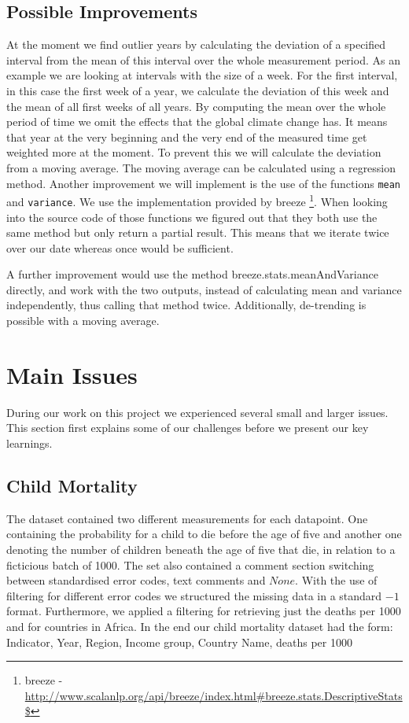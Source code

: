 \documentclass[
10pt, %
a4paper, %
oneside, %
headinclude,footinclude, %
useAMS,
usenatbib
]{template/mn2e}  %
\begin{document}
\subsection{Possible Improvements}
At the moment we find outlier years by calculating the deviation of a specified interval from the mean of this interval over the whole measurement period. As an example we are looking at intervals with the size of a week. For the first interval, in this case the first week of a year, we calculate the deviation of this week and the mean of all first weeks of all years. By computing the mean over the whole period of time we omit the effects that the global climate change has. It means that year at the very beginning and the very end of the measured time get weighted more at the moment. To prevent this we will calculate the deviation from a moving average. The moving average can be calculated using a regression method.  Another improvement we will implement is the use of the functions \texttt{mean} and \texttt{variance}. We use the implementation provided by breeze \footnote{breeze -  \url{http://www.scalanlp.org/api/breeze/index.html\#breeze.stats.DescriptiveStats\$}}. When looking into the source code of those functions we figured out that they both use the same method but only return a partial result. This means that we iterate twice over our date whereas once would be sufficient.

A further improvement would use the method breeze.stats.meanAndVariance directly, and work with the two outputs, instead of calculating mean and variance independently, thus calling that method twice.
Additionally, de-trending is possible with a moving average.


\section{Main Issues}
\label{sec:issues}
During our work on this project we experienced several small and larger issues. This section first explains some of our challenges before we present our key learnings.

\subsection{Child Mortality}
The dataset contained two different measurements for each datapoint. One containing the probability for a child to die before the age of five and another one denoting the number of children beneath the age of five that die, in relation to a ficticious batch of 1000. The set also contained a comment section switching between standardised error codes, text comments and $None$.  With the use of filtering for different error codes we structured the missing data in a standard $-1$ format. Furthermore, we applied a filtering for retrieving just the deaths per 1000 and for countries in Africa. In the end our child mortality dataset had the form: Indicator, Year, Region, Income group, Country Name, deaths per 1000
\end{document}
